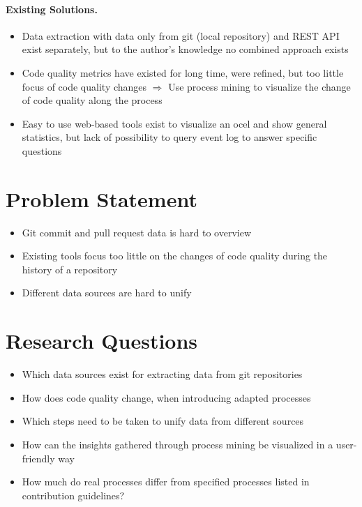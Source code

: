 \paragraph{Existing Solutions.}
\begin{itemize}
	\item Data extraction with data only from git (local repository) and REST API exist separately, but to the author's knowledge no combined approach exists
	\item Code quality metrics have existed for long time, were refined, but too little focus of code quality changes $\Rightarrow$ Use process mining to visualize the change of code quality along the process
	\item Easy to use web-based tools exist to visualize an \ac{ocel} and show general statistics, but lack of possibility to query event log to answer specific questions
\end{itemize}


\section{Problem Statement}
\label{sec:intro_ssec:probs}
\begin{itemize}
	\item Git commit and pull request data is hard to overview
	\item Existing tools focus too little on the changes of code quality during the history of a repository
	\item Different data sources are hard to unify
\end{itemize}


\section{Research Questions}
\label{sec:intro_ssec:rqs}
\begin{itemize}
	\item Which data sources exist for extracting data from git repositories
	\item How does code quality change, when introducing adapted processes
	\item Which steps need to be taken to unify data from different sources
	\item How can the insights gathered through process mining be visualized in a user-friendly way
	\item How much do real processes differ from specified processes listed in contribution guidelines?
\end{itemize}

